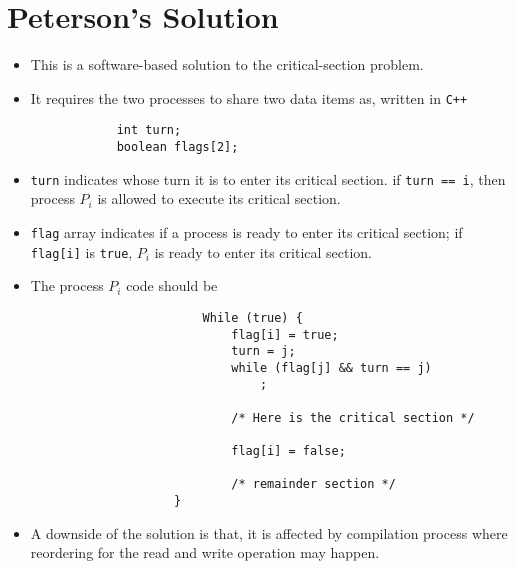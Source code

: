 \documentclass{report}
\def\code#1{\texttt{#1}}
\begin{document}
\section{Peterson's Solution}%

\begin{itemize}
	\item This is a software-based solution to the critical-section problem.
	\item It requires the two processes to share two data items as, written in \code{C++}
	      \begin{verbatim}
            int turn;
            boolean flags[2];
\end{verbatim}
	\item \code{turn} indicates whose turn it is to enter its critical section.
	      if \code{turn == i}, then process $ P_{i} $ is allowed to execute its critical section.
	\item \code{flag} array indicates if a process is ready to enter its critical section;
	      if \code{flag[i]} is \code{true}, $ P_i $ is ready to enter its critical section.
	\item The process $ P_i $	code should be
	      \begin{verbatim}
						While (true) {
							flag[i] = true;
							turn = j;
							while (flag[j] && turn == j)
								;

							/* Here is the critical section */

							flag[i] = false;

							/* remainder section */
					}
				\end{verbatim}
	\item A downside of the solution is that, it is affected by compilation process where reordering
	      for the read and write operation may happen.
\end{itemize}
\end{document}
